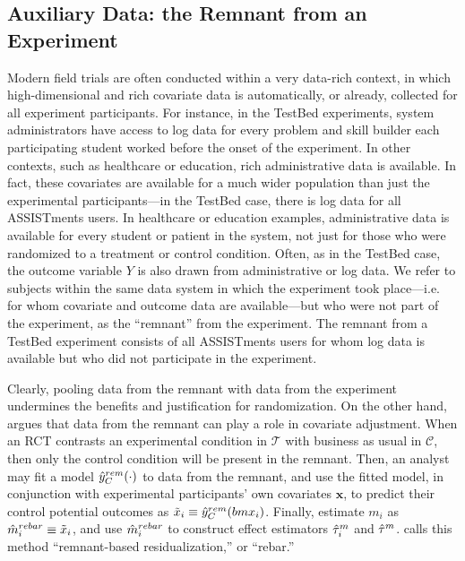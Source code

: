 \subsection{Auxiliary Data: the Remnant from an Experiment}\label{sec:intro.remant}

Modern field trials are often conducted within a very data-rich
context, in which high-dimensional and rich covariate data is
automatically, or already, collected for all experiment participants.
For instance, in the TestBed experiments, system administrators have
access to log data for every problem and skill builder each
participating student worked before the onset of the experiment.
In other contexts, such as healthcare or education, rich
administrative data is available.
In fact, these covariates are available for a much wider population
than just the experimental participants---in the TestBed case, there
is log data for all ASSISTments users.
In healthcare or education examples, administrative data is available
for every student or patient in the system, not just for those who
were randomized to a treatment or control condition.
Often, as in the TestBed case, the outcome variable $Y$ is also drawn from administrative or
log data.
We refer to subjects within the same data system in which the
experiment took place---i.e. for whom covariate and outcome data are
available---but who were not part of the experiment, as the ``remnant'' from the experiment.
The remnant from a TestBed experiment consists of all ASSISTments
users for whom log data is available but who did not participate in
the experiment.

Clearly, pooling data from the remnant with data from the experiment
undermines the benefits and justification for randomization.
On the other hand, \citet{rebarEDM} argues that data from the remnant
can play a role in covariate adjustment.
When an RCT contrasts an experimental condition in $\mathcal{T}$ with
business as usual in $\mathcal{C}$, then only the control condition
will be present in the remnant.
Then, an analyst may fit a model $\hat{y}_C^{rem}(\cdot)$ to data
from the remnant, and use the fitted model, in conjunction with
experimental participants' own covariates $\bm{x}$, to predict their
control potential outcomes as $\tilde{x}_i\equiv \hat{y}_C^{rem}(bm{x}_i)$.
Finally, estimate $m_i$ as $\hat{m}_i^{rebar} \equiv \tilde{x}_i$, and
use $\hat{m}_i^{rebar}$ to construct effect estimators $\hat{\tau}_i^m$ and
$\hat{\tau}^m$.
\citet{rebarEDM} calls this method ``remnant-based residualization,''
or ``rebar.''

